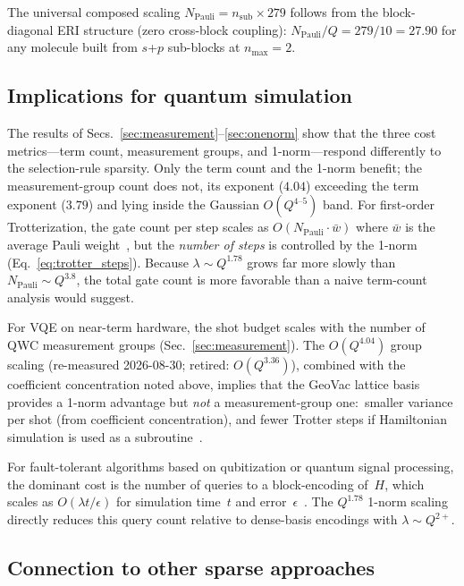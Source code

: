\documentclass[aps,pra,twocolumn,superscriptaddress,longbibliography]{revtex4-2}
\newcommand{\gvq}[2]{#2}
\begin{document}
The universal composed scaling $N_{\text{Pauli}} = n_{\text{sub}} \times \gvq{block_sp_n2_pauli}{279}$
follows from the block-diagonal ERI structure (zero cross-block coupling):
$N_{\text{Pauli}} / Q = \gvq{block_sp_n2_pauli}{279}/10 = \gvq{composed_coeff}{27.90}$ for any molecule built from $s$+$p$
sub-blocks at $n_{\max} = 2$.

\subsection{Implications for quantum simulation}
\label{sec:trotter}

The results of Secs.~\ref{sec:measurement}--\ref{sec:onenorm}
show that the three cost metrics---term count, measurement groups,
and 1-norm---respond differently to the selection-rule sparsity.  Only the
term count and the 1-norm benefit; the measurement-group count does not,
its exponent ($4.04$) exceeding the term exponent ($3.79$) and lying inside
the Gaussian $O(Q^{4\text{--}5})$ band.  For first-order Trotterization, the gate count per
step scales as $O(N_{\mathrm{Pauli}} \cdot \bar{w})$ where $\bar{w}$
is the average Pauli weight~\cite{childs2021}, but the
\emph{number of steps} is controlled by the 1-norm
(Eq.~\ref{eq:trotter_steps}).  Because $\lambda \sim Q^{1.78}$ grows
far more slowly than $N_{\mathrm{Pauli}} \sim Q^{3.8}$, the total
gate count is more favorable than a naive term-count analysis would
suggest.

For VQE on near-term hardware, the shot budget scales with the number
of QWC measurement groups (Sec.~\ref{sec:measurement}).  The
$O(Q^{4.04})$ group scaling (re-measured 2026-08-30; retired:
$O(Q^{3.36})$), combined with the coefficient
concentration noted above, implies that the GeoVac lattice basis
provides a 1-norm advantage but \emph{not} a measurement-group one:\
smaller
variance per shot (from coefficient concentration), and fewer Trotter
steps if Hamiltonian simulation is used as a
subroutine~\cite{verteletskyi2020}.

For fault-tolerant algorithms based on qubitization or quantum signal
processing, the dominant cost is the number of queries to a
block-encoding of~$H$, which scales as $O(\lambda t / \epsilon)$ for
simulation time~$t$ and error~$\epsilon$~\cite{childs2021}.  The
$Q^{1.78}$ 1-norm scaling directly reduces this query count relative
to dense-basis encodings with $\lambda \sim Q^{2+}$.

\subsection{Connection to other sparse approaches}
\label{sec:related}
\end{document}
